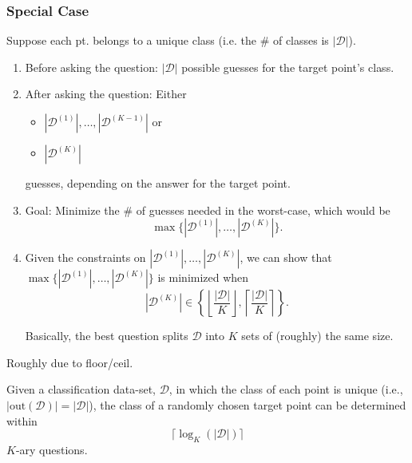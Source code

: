 \subsubsection{Special Case}
\begin{notes}
    Suppose each pt. belongs to a unique class (i.e. the \# of classes is $|\mathcal{D}|$).
    \begin{enumerate}
    \item Before asking the question: \( |\mathcal{D}| \) possible guesses for the target point’s class.
    \item After asking the question: Either 
    \begin{itemize}
        \item \( |\mathcal{D}^{(1)}|, \dots, |\mathcal{D}^{(K-1)}| \) or 
        \item \( |\mathcal{D}^{(K)}| \) 
    \end{itemize}
    guesses, depending on the answer for the target point.

    \item Goal: Minimize the \# of guesses needed in the worst-case, which would be 
    \[
    \max \{ |\mathcal{D}^{(1)}|, \dots, |\mathcal{D}^{(K)}| \}.
    \]

    \item Given the constraints on \( |\mathcal{D}^{(1)}|, \dots, |\mathcal{D}^{(K)}| \), we can show that $\max \{ |\mathcal{D}^{(1)}|, \dots, |\mathcal{D}^{(K)}| \}$ is minimized when
    \[
    |\mathcal{D}^{(K)}| \in \left\{ \left\lfloor \frac{|\mathcal{D}|}{K} \right\rfloor, \left\lceil \frac{|\mathcal{D}|}{K} \right\rceil \right\}.
    \]

    Basically, the best question splits \( \mathcal{D} \) into \( K \) sets of (roughly) the same size.
    \end{enumerate}
\end{notes}

\begin{warning}
    Roughly due to floor/ceil.
\end{warning}

\begin{theorem}
    Given a classification data-set, \( \mathcal{D} \), in which the class of each point is unique (i.e., \( |\text{out}(\mathcal{D})| = |\mathcal{D}| \)), the class of a randomly chosen target point can be determined within 
    \[
    \lceil \log_K (|\mathcal{D}|) \rceil
    \]
    \( K \)-ary questions.

\end{theorem}

